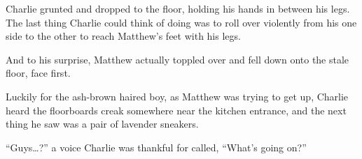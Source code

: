 Charlie grunted and dropped to the floor, holding his hands in between his legs. The last thing Charlie could think of doing was to roll over violently from his one side to the other to reach Matthew's feet with his legs.

And to his surprise, Matthew actually toppled over and fell down onto the stale floor, face first.

Luckily for the ash-brown haired boy, as Matthew was trying to get up, Charlie heard the floorboards creak somewhere near the kitchen entrance, and the next thing he saw was a pair of lavender sneakers.

“Guys…?” a voice Charlie was thankful for called, “What's going on?”